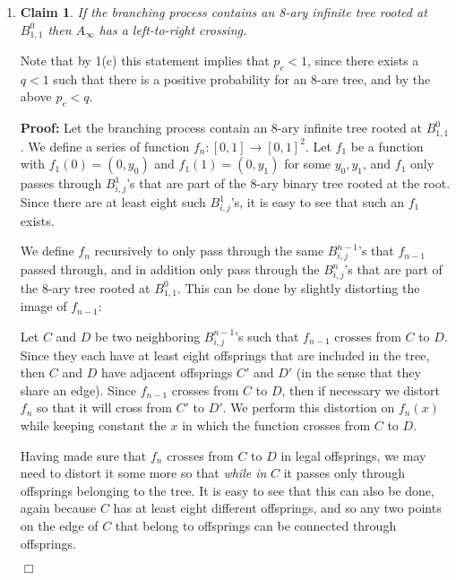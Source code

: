 \documentclass[11pt]{article} \usepackage{amssymb}
\newtheorem{claim}[theorem]{Claim}
\newenvironment{proof}{\noindent \textbf{Proof:}}{$\Box$}
\begin{document}
\begin{enumerate}
\begin{enumerate}
    \item
      \begin{claim}
        If the branching process contains an 8-ary infinite tree rooted
        at $B_{1,1}^0$ then $A_\infty$ has a left-to-right crossing.
      \end{claim}
      Note that by 1(c) this statement implies that $p_c<1$, since there exists
      a $q<1$ such that there is a positive probability for an 8-are tree,
      and by the above $p_c<q$.

      \begin{proof}
        Let the branching process contain an 8-ary infinite tree rooted at 
        $B_{1,1}^0$. We define a series of function $f_n:[0,1]\to[0,1]^2$.
        Let $f_1$ be a function with $f_1(0)=(0,y_0)$ and 
        $f_1(1)=(0,y_1)$ for some $y_0,y_1$, and $f_1$ only passes through
        $B_{i,j}^1$'s that are part of the 8-ary binary tree rooted at the root.
        Since there are at least eight such $B_{i,j}^1$'s, it is easy to see 
        that such an $f_1$ exists.

        We define $f_n$ recursively to only pass through the same $B_{i,j}^{n-1}$'s
        that $f_{n-1}$ passed through, and in addition only pass through
        the $B_{i,j}^n$'s that are
        part of the 8-ary tree rooted at $B_{1,1}^0$. This can be done by slightly 
        distorting the image of $f_{n-1}$:

        Let $C$ and $D$ be
        two neighboring 
        $B_{i,j}^{n-1}$'s such that $f_{n-1}$ crosses from $C$ to $D$. Since they each have at 
        least eight offsprings that are included in the tree, then $C$ and $D$
        have adjacent offsprings $C'$ and $D'$ (in the sense that they share an 
        edge).
        Since $f_{n-1}$ crosses from $C$ to $D$, then if necessary we distort $f_n$ so 
        that it will cross from
        $C'$ to $D'$. We perform this distortion on $f_n(x)$ while keeping 
        constant the $x$
        in which the function crosses from $C$ to $D$.
        
        Having made sure that $f_n$ crosses from $C$ to $D$ in legal offsprings,
        we may need to distort it some more so that {\em while in} $C$ it 
        passes only
        through offsprings belonging to the tree. It is easy to see that this
        can also be done, again because $C$ has at least eight different 
        offsprings, and so any two points on the edge of $C$ that belong to
        offsprings can be connected through offsprings.


\end{proof}
\end{enumerate}
\end{enumerate}
\end{document}
